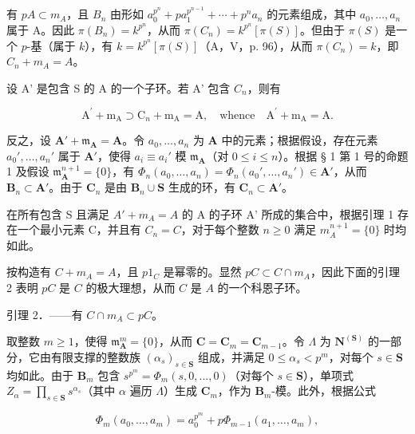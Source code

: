 有 \(pA \subset m_A\)，且 \(B_n\) 由形如 \(a_0^{p^n} + pa_1^{p^{n-1}} + \cdots + p^n a_n\) 的元素组成，其中 \(a_0, \ldots, a_n\) 属于 A。因此 \(\pi(B_n) = k^{p^n}\)，从而 \(\pi(C_n) = k^{p^n}[\pi(S)]\)。但由于 \(\pi(S)\) 是一个 \(p\)-基（属于 \(k\)），有 \(k = k^{p^n}[\pi(S)]\)（A，V，p. 96），从而 \(\pi(C_n) = k\)，即 \(C_n + m_A = A\)。

设 A' 是包含 S 的 A 的一个子环。若 A' 包含 \(C_{n}\)，则有

\[
\mathrm{A} ^ {\prime} + \mathrm{m} _ {\mathrm{A}} \supset \mathrm{C} _ {n} + \mathrm{m} _ {\mathrm{A}} = \mathrm{A}, \quad \mathrm{whence} \quad \mathrm{A} ^ {\prime} + \mathrm{m} _ {\mathrm{A}} = \mathrm{A}.
\]

反之，设 \(\mathbf{A}' + \mathfrak{m}_{\mathbf{A}} = \mathbf{A}\)。令 \(a_0, \ldots, a_n\) 为 \(\mathbf{A}\) 中的元素；根据假设，存在元素 \(a_0', \ldots, a_n'\) 属于 \(\mathbf{A}'\)，使得 \(a_i \equiv a_i'\) 模 \(\mathfrak{m}_{\mathbf{A}}\)（对 \(0 \leqslant i \leqslant n\)）。根据 § 1 第 1 号的命题 1 及假设 \(\mathfrak{m}_{\mathbf{A}}^{n+1} = \{0\}\)，有 \(\Phi_n(a_0, \ldots, a_n) = \Phi_n(a_0', \ldots, a_n') \in \mathbf{A}'\)，从而 \(\mathbf{B}_n \subset \mathbf{A}'\)。由于 \(\mathbf{C}_n\) 是由 \(\mathbf{B}_n \cup \mathbf{S}\) 生成的环，有 \(\mathbf{C}_n \subset \mathbf{A}'\)。

在所有包含 S 且满足 \(A' + m_{A} = A\) 的 A 的子环 A' 所成的集合中，根据引理 1 存在一个最小元素 C，并且有 \(C_{n} = C\)，对于每个整数 \(n \geqslant 0\) 满足 \(m_{A}^{n+1} = \{0\}\) 时均如此。

按构造有 \(C + m_A = A\)，且 \(p1_C\) 是幂零的。显然 \(pC \subset C \cap m_A\)，因此下面的引理 2 表明 \(pC\) 是 \(C\) 的极大理想，从而 \(C\) 是 \(A\) 的一个科恩子环。

引理 2．——有 \(C \cap m_{A} \subset pC\)。

取整数 \(m \geqslant 1\)，使得 \(\mathfrak{m}_{\mathbf{A}}^{m} = \{0\}\)，从而 \(\mathbf{C} = \mathbf{C}_{m} = \mathbf{C}_{m-1}\)。令 \(\Lambda\) 为 \(\mathbf{N}^{(\mathbf{S})}\) 的一部分，它由有限支撑的整数族 \((\alpha_{s})_{s \in \mathbf{S}}\) 组成，并满足 \(0 \leqslant \alpha_{s} < p^{m}\)，对每个 \(s \in \mathbf{S}\) 均如此。由于 \(\mathbf{B}_{m}\) 包含 \(s^{p^{m}} = \Phi_{m}(s, 0, ..., 0)\)（对每个 \(s \in \mathbf{S}\)），单项式 \(Z_{\alpha} = \prod_{s \in \mathbf{S}} s^{\alpha_{s}}\)（其中 \(\alpha\) 遍历 \(\Lambda\)）生成 \(\mathbf{C}_{m}\)，作为 \(\mathbf{B}_{m}\)-模。此外，根据公式

\[
\Phi_ {m} (a _ {0}, \dots , a _ {m}) = a _ {0} ^ {p ^ {m}} + p \Phi_ {m - 1} (a _ {1}, \dots , a _ {m}),
\]

